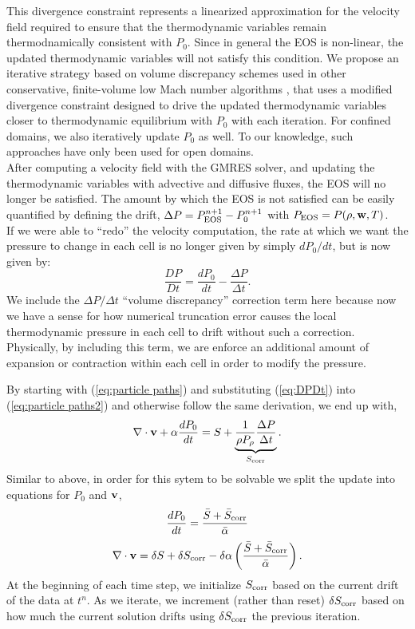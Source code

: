 \documentclass[final]{siamltex}
\def\vb {{\bf v}}
\def\wb {{\bf w}}
\begin{document}
This divergence constraint represents a linearized approximation for the velocity 
field required to ensure that the thermodynamic variables remain thermodnamically
consistent with $P_0$.  Since in general the EOS is non-linear, the updated 
thermodynamic variables will not
satisfy this condition.  We propose an iterative strategy based on
volume discrepancy schemes used
in other conservative, finite-volume low Mach number algorithms
\cite{Pember:1998,XRB}, that
uses a modified divergence constraint designed to drive the updated 
thermodynamic variables closer to thermodynamic equilibrium with $P_0$ with each iteration.
For confined domains, we also iteratively update $P_0$ as well.  To our knowledge,
such approaches have only been used for open domains.\\

After computing a velocity field with the GMRES solver, and updating the thermodynamic
variables with advective and diffusive fluxes, the EOS will no longer be satisfied.
The amount by which the EOS is not satisfied can be easily quantified by defining
the drift, $\Delta P = P_{\rm EOS}^{n+1} - P_0^{n+1}$ with $P_{\rm EOS} = P(\rho,\wb,T)$.\\

If we were able to ``redo'' the velocity computation, the rate at which we want the 
pressure to change in each cell is no longer given
by simply $dP_0/dt$, but is now given by:
\begin{equation}
\frac{DP}{Dt} = \frac{dP_0}{dt} - \frac{\Delta P}{\Delta t}.\label{eq:DPDt}
\end{equation}
We include the $\Delta P/\Delta t$ ``volume discrepancy'' correction term here because 
now we have a sense for how numerical truncation error causes the local thermodynamic pressure in 
each cell to drift without such a correction.  Physically, by including this term, we are enforce 
an additional amount of expansion or contraction within each cell in order to modify 
the pressure.  

By starting with (\ref{eq:particle paths}) and substituting (\ref{eq:DPDt}) into (\ref{eq:particle paths2})
and otherwise follow the same derivation, we end up with,
\begin{equation}
\nabla\cdot\vb + \alpha\frac{dP_0}{dt} = S + \underbrace{\frac{1}{\rho P_\rho}\frac{\Delta P}{\Delta t}}_{S_{\rm corr}}.
\end{equation}
Similar to above, in order for this sytem to be solvable we split the update into
equations for $P_0$ and $\vb$,
\begin{equation}
\frac{dP_0}{dt} = \frac{\bar{S} + \bar{S}_{\rm corr}}{\bar{\alpha}}
\end{equation}
\begin{equation}
\nabla\cdot\vb = \delta S + \delta S_{\rm corr} - \delta\alpha\left(\frac{\bar{S} + \bar{S}_{\rm corr}}{\bar{\alpha}}\right).
\end{equation}
At the beginning of each time step, we initialize $S_{\rm corr}$ based on the current drift of the data at $t^n$.
As we iterate, we increment (rather than reset) $\delta S_{\rm corr}$ based on how much 
the current solution drifts using $\delta S_{\rm corr}$ the previous iteration.
\end{document}
